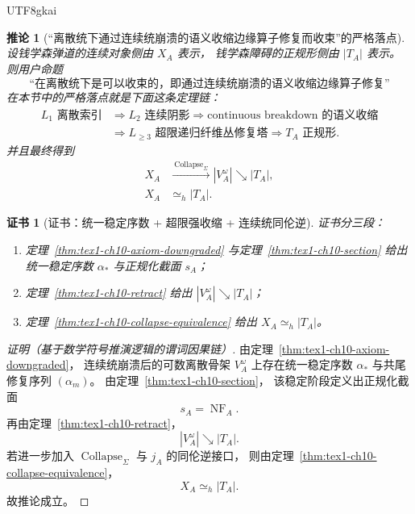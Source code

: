 \documentclass[12pt]{article}
\newtheorem{corollary}{推论}[section]
\newtheorem{Certificate}{证书}[section]
\newcommand{\Collapse}{\operatorname{Collapse}}
\begin{document}
\begin{CJK*}{UTF8}{gkai}
\begin{corollary}[“离散统下通过连续统崩溃的语义收缩边缘算子修复而收束”的严格落点]
\label{cor:tex1-ch10-final}
设钱学森弹道的连续对象侧由 \(X_A\) 表示，
钱学森障碍的正规形侧由 \(|T_A|\) 表示。
则用户命题
\[
  \text{“在离散统下是可以收束的，即通过连续统崩溃的语义收缩边缘算子修复”}
\]
在本节中的严格落点就是下面这条定理链：
\[
  \begin{aligned}
    L_1\text{ 离散索引}
    &\Longrightarrow
    L_2\text{ 连续阴影}
    \Longrightarrow
    \text{continuous breakdown 的语义收缩}\\
    &\Longrightarrow
    L_{\ge 3}\text{ 超限递归纤维丛修复塔}
    \Longrightarrow
    T_A\text{ 正规形}.
  \end{aligned}
\]
并且最终得到
\[
  \boxed{
    \begin{aligned}
      X_A&\xrightarrow{\ \Collapse_{\Sigma}\ }|V_A^\omega|
      \searrow |T_A|,\\
      X_A&\simeq_h |T_A|.
    \end{aligned}
  }
\]
\end{corollary}

\begin{Certificate}[证书：统一稳定序数 + 超限强收缩 + 连续统同伦逆]
\label{cert:tex1-ch10-final}
证书分三段：
\begin{enumerate}
  \item 定理~\ref{thm:tex1-ch10-axiom-downgraded} 与定理~\ref{thm:tex1-ch10-section} 给出统一稳定序数 \(\alpha_\ast\) 与正规化截面 \(s_A\)；
  \item 定理~\ref{thm:tex1-ch10-retract} 给出 \(|V_A^\omega|\searrow |T_A|\)；
  \item 定理~\ref{thm:tex1-ch10-collapse-equivalence} 给出 \(X_A\simeq_h |T_A|\)。
\end{enumerate}
\end{Certificate}

\begin{proof}[证明（基于数学符号推演逻辑的谓词因果链）]
由定理~\ref{thm:tex1-ch10-axiom-downgraded}，
连续统崩溃后的可数离散骨架 \(V_A^\omega\) 上存在统一稳定序数 \(\alpha_\ast\) 与共尾修复序列 \((\alpha_m)\)。
由定理~\ref{thm:tex1-ch10-section}，
该稳定阶段定义出正规化截面
\[
  s_A=\operatorname{NF}_A.
\]
再由定理~\ref{thm:tex1-ch10-retract}，
\[
  |V_A^\omega|\searrow |T_A|.
\]
若进一步加入 \(\Collapse_{\Sigma}\) 与 \(j_A\) 的同伦逆接口，
则由定理~\ref{thm:tex1-ch10-collapse-equivalence}，
\[
  X_A\simeq_h |T_A|.
\]
故推论成立。
\end{proof}


\end{CJK*}
\end{document}
